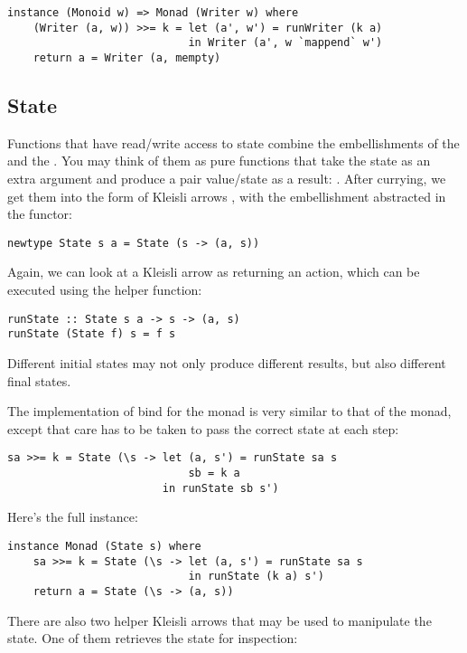 \begin{Verbatim}[commandchars=\\\{\}]
instance (Monoid w) => Monad (Writer w) where
    (Writer (a, w)) >>= k = let (a', w') = runWriter (k a)
                            in Writer (a', w `mappend` w')
    return a = Writer (a, mempty)
\end{Verbatim}

\subsection{State}\label{state}

Functions that have read/write access to state combine the
embellishments of the  and the . You may
think of them as pure functions that take the state as an extra argument
and produce a pair value/state as a result:
. After currying, we get them
into the form of Kleisli arrows
, with the
embellishment abstracted in the  functor:

\begin{Verbatim}[commandchars=\\\{\}]
newtype State s a = State (s -> (a, s))
\end{Verbatim}
Again, we can look at a Kleisli arrow as returning an action, which can
be executed using the helper function:

\begin{Verbatim}[commandchars=\\\{\}]
runState :: State s a -> s -> (a, s)
runState (State f) s = f s
\end{Verbatim}
Different initial states may not only produce different results, but
also different final states.

The implementation of bind for the  monad is very similar
to that of the  monad, except that care has to be taken
to pass the correct state at each step:

\begin{Verbatim}
sa >>= k = State (\s -> let (a, s') = runState sa s
                            sb = k a 
                        in runState sb s')
\end{Verbatim}
Here's the full instance:

\begin{Verbatim}
instance Monad (State s) where
    sa >>= k = State (\s -> let (a, s') = runState sa s
                            in runState (k a) s')
    return a = State (\s -> (a, s))
\end{Verbatim}
There are also two helper Kleisli arrows that may be used to manipulate
the state. One of them retrieves the state for inspection:

